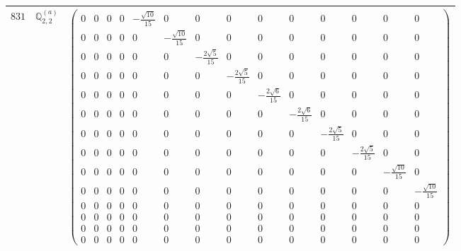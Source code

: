 \documentclass[fleqn,8pt,landscape]{jsarticle}
\begin{document}
\begin{center}
\begin{longtable}{ccc}
$ 831 $ & $ \mathbb{Q}_{2,2}^{(a)} $ & $ \begin{pmatrix} 0 & 0 & 0 & 0 & - \frac{\sqrt{10}}{15} & 0 & 0 & 0 & 0 & 0 & 0 & 0 & 0 & 0 \\ 0 & 0 & 0 & 0 & 0 & - \frac{\sqrt{10}}{15} & 0 & 0 & 0 & 0 & 0 & 0 & 0 & 0 \\ 0 & 0 & 0 & 0 & 0 & 0 & - \frac{2 \sqrt{5}}{15} & 0 & 0 & 0 & 0 & 0 & 0 & 0 \\ 0 & 0 & 0 & 0 & 0 & 0 & 0 & - \frac{2 \sqrt{5}}{15} & 0 & 0 & 0 & 0 & 0 & 0 \\ 0 & 0 & 0 & 0 & 0 & 0 & 0 & 0 & - \frac{2 \sqrt{6}}{15} & 0 & 0 & 0 & 0 & 0 \\ 0 & 0 & 0 & 0 & 0 & 0 & 0 & 0 & 0 & - \frac{2 \sqrt{6}}{15} & 0 & 0 & 0 & 0 \\ 0 & 0 & 0 & 0 & 0 & 0 & 0 & 0 & 0 & 0 & - \frac{2 \sqrt{5}}{15} & 0 & 0 & 0 \\ 0 & 0 & 0 & 0 & 0 & 0 & 0 & 0 & 0 & 0 & 0 & - \frac{2 \sqrt{5}}{15} & 0 & 0 \\ 0 & 0 & 0 & 0 & 0 & 0 & 0 & 0 & 0 & 0 & 0 & 0 & - \frac{\sqrt{10}}{15} & 0 \\ 0 & 0 & 0 & 0 & 0 & 0 & 0 & 0 & 0 & 0 & 0 & 0 & 0 & - \frac{\sqrt{10}}{15} \\ 0 & 0 & 0 & 0 & 0 & 0 & 0 & 0 & 0 & 0 & 0 & 0 & 0 & 0 \\ 0 & 0 & 0 & 0 & 0 & 0 & 0 & 0 & 0 & 0 & 0 & 0 & 0 & 0 \\ 0 & 0 & 0 & 0 & 0 & 0 & 0 & 0 & 0 & 0 & 0 & 0 & 0 & 0 \\ 0 & 0 & 0 & 0 & 0 & 0 & 0 & 0 & 0 & 0 & 0 & 0 & 0 & 0 \end{pmatrix} $ \\ \hline

\end{longtable}
\end{center}
\end{document}
